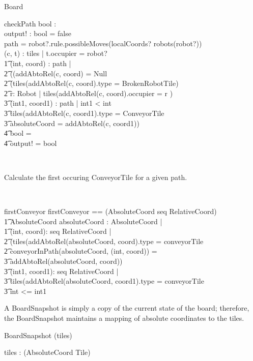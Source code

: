 \begin{class}{Board}
\begin{schema}{checkPath}
bool : \bool \\
output! : \bool
\where
bool = false \\
path = robot?.rule.possibleMoves(localCoords? \cross robots(robot?)) \\
\exists (c, t) : tiles | t.occupier = robot? \implies \\ \t1
\forall (int, coord) : path | \\ \t2
((addAbtoRel(c, coord) = Null \vee \\ \t2
(tiles(addAbtoRel(c, coord).type = BrokenRobotTile) \vee \\ \t2
\exists r: Robot | tiles(addAbtoRel(c, coord).occupier = r )\implies \\ \t3
\exists (int1, coord1) : path | int1 < int \\ \t3
tiles(addAbtoRel(c, coord1).type = ConveyorTile \\ \t3
absoluteCoord = addAbtoRel(c, coord1)) \implies \\ \t4
bool = \true \\ \t4
output! = bool
\end{schema} \\
\znewpage
\begin{classcom}
Calculate the first occuring ConveyorTile for a given path.
\end{classcom} \\
\begin{schema}{firstConveyor}
firstConveyor == (AbsoluteCoord \cross seq RelativeCoord) \fun \\ \t1 AbsoluteCoord
\where
\exists absoluteCoord : AbsoluteCoord |  \\ \t1
\exists (int, coord): seq RelativeCoord |  \\ \t2
(tiles(addAbtoRel(absoluteCoord, coord).type = conveyorTile \\ \t2
conveyorInPath(absoluteCoord, (int, coord)) = \\ \t3 addAbtoRel(absoluteCoord, coord)) \implies \\ \t3
\forall (int1, coord1): seq RelativeCoord | \\ \t3
\IF tiles(addAbtoRel(absoluteCoord, coord1).type = conveyorTile \\ \t3
\THEN int <= int1
\end{schema}
\end{class}

A BoardSnapshot is simply a copy of the current state of the board; therefore, the BoardSnapshot maintains a mapping of absolute coordinates to the tiles.
\begin{class}{BoardSnapshot}
\upharpoonright (tiles) \\
\begin{state}
tiles : \power (AbsoluteCoord \fun Tile) \\
\end{state}
\end{class}

